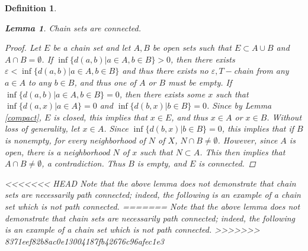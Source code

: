 \documentclass[11pt]{article}
\newtheorem{defn}[thm]{Definition}
\newtheorem{lem}[thm]{Lemma}
\begin{document}
\begin{defn}
\begin{lem}\label{chainconnected}
Chain sets are connected.
\end{lem}
\begin{proof}
Let $E$ be a chain set and let $A,B$ be open sets such that $E\subset A\cup B$ and $A\cap B=\emptyset$.  If $\inf\{d(a,b)|a\in A, b\in B\}>0$, then there exists $\varepsilon<\inf\{d(a,b)|a\in A, b\in B\}$ and thus there exists no $\varepsilon, T-$chain from any $a\in A$ to any $b\in B$, and thus one of $A$ or $B$ must be empty.  If $\inf\{d(a,b)|a\in A, b\in B\}=0$, then there exists some $x$ such that $\inf\{d(a,x)|a\in A\}=0$ and $\inf\{d(b,x)|b\in B\}=0$.  Since by Lemma \ref{compact}, $E$ is closed, this implies that $x\in E$, and thus $x\in A$ or $x\in B$.  Without loss of generality, let $x\in A$.  Since $\inf\{d(b,x)|b\in B\}=0$, this implies that if $B$ is nonempty, for every neighborhood of $N$ of $X$, $N\cap B\not= \emptyset$.  However, since $A$ is open, there is a neighborhood $N$ of $x$ such that $N\subset A$.  This then implies that $A\cap B\not = \emptyset$, a contradiction.  Thus $B$ is empty, and $E$ is connected.

\end{proof}

<<<<<<< HEAD
\noindent Note that the above lemma does not demonstrate that chain sets are necessarily path connected; indeed, the following is an example of a chain set which is not path connected. 
=======
Note that the above lemma does not demonstrate that chain sets are necessarily path connected; indeed, the following is an example of a chain set which is not path connected. 
>>>>>>> 8371eef82b8ac0e13004187fb42676c96afec1e3


\end{defn}
\end{document}
